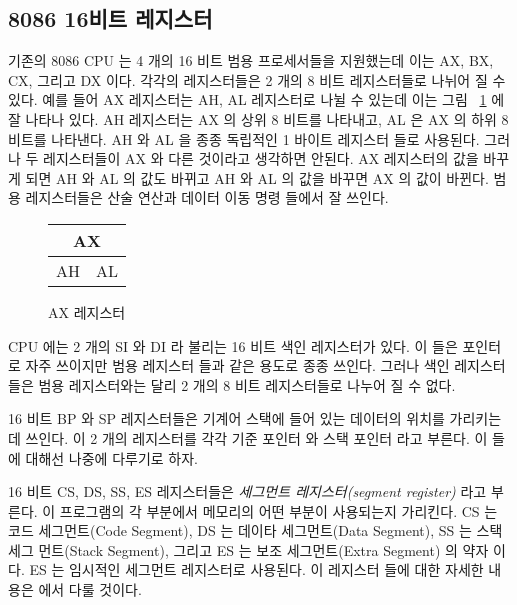 \subsection{8086 16비트 레지스터}

기존의 8086 CPU 는 4 개의 16 비트 범용 프로세서들을 지원했는데 이는 AX, BX, CX, 그리고 DX 이다. 각각의 레지스터들은
2 개의 8 비트 레지스터들로 나뉘어 질 수 있다. 예를 들어 AX 레지스터는 AH, AL 레지스터로 나뉠 수 있는데 이는 그림 ~\ref{fig:AX_reg}
에 잘 나타나 있다. AH 레지스터는 AX 의 상위 8 비트를 나타내고, AL 은 AX 의 하위 8 비트를 나타낸다. AH 와 AL 을 종종 독립적인
1 바이트 레지스터 들로 사용된다. 그러나 두 레지스터들이 AX 와 다른 것이라고 생각하면 안된다. AX 레지스터의 값을 바꾸게 되면
AH 와 AL 의 값도 바뀌고 AH 와 AL 의 값을 바꾸면 AX 의 값이 바뀐다. 범용 레지스터들은 산술 연산과 데이터 이동 명령 들에서 
잘 쓰인다. 

\begin{figure}
\begin{center}
\begin{tabular}{cc}
\multicolumn{2}{c}{AX} \\
\hline
\multicolumn{1}{||c|}{AH} & \multicolumn{1}{c||}{AL} \\
\hline
\end{tabular} 
\caption{AX 레지스터 \label{fig:AX_reg} }
\end{center}
\end{figure}

CPU 에는 2 개의 SI 와 DI 라 불리는 16 비트 색인 레지스터가 있다.  이 들은 포인터로 자주 쓰이지만 범용 레지스터
들과 같은 용도로 종종 쓰인다. 그러나 색인 레지스터들은 범용 레지스터와는 달리 2 개의 8 비트 레지스터들로 나누어 질 수 없다.

16 비트 BP 와 SP 레지스터들은 기계어 스택에 들어 있는 데이터의 위치를 가리키는데 쓰인다. 이 2 개의 레지스터를 각각 기준 포인터
 와 스택 포인터 라고 부른다. 이 들에 대해선 나중에 다루기로 하자. 

16 비트 CS, DS, SS, ES 레지스터들은 \emph{세그먼트 레지스터(segment register)} 라고 부른다.  이 프로그램의 각 부분에서 
메모리의 어떤 부분이 사용되는지 가리킨다. CS 는 코드 세그먼트(Code Segment), DS 는 데이타 세그먼트(Data Segment), SS 는 스택 세그
먼트(Stack Segment), 그리고 ES 는 보조 세그먼트(Extra Segment) 의 약자 이다. ES 는 임시적인 세그먼트 레지스터로 사용된다. 이 레지스터
들에 대한 자세한 내용은 %
에서 다룰 것이다. 

